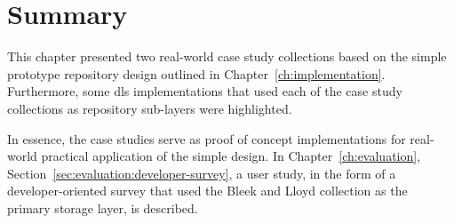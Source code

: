 \section[Summary]{Summary}
\label{sec:case-studies:summary}

This chapter presented two real-world case study collections based on the simple prototype repository design outlined in Chapter~\ref{ch:implementation}. Furthermore, some \gls{dls} implementations that used each of the case study collections as repository sub-layers were highlighted.

In essence, the case studies serve as proof of concept implementations for real-world practical application of the simple design. In Chapter~\ref{ch:evaluation}, Section~\ref{sec:evaluation:developer-survey}, a user study, in the form of a developer-oriented survey that used the Bleek and Lloyd collection as the primary storage layer, is described.